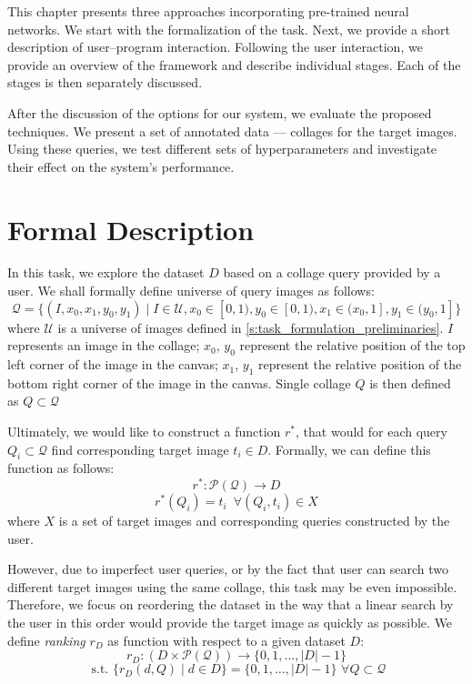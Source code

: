 This chapter presents three approaches incorporating pre-trained neural networks. We start with the formalization of the task. Next, we provide a short description of user--program interaction. Following the user interaction, we provide an overview of the framework and describe individual stages. Each of the stages is then separately discussed. 

After the discussion of the options for our system, we evaluate the proposed techniques. We present a set of annotated data --- collages for the target images. Using these queries, we test different sets of hyperparameters and investigate their effect on the system's performance. 

\section{Formal Description}
\label{s:task_formulation}

In this task, we explore the dataset $D$ based on a collage query provided by a user. We shall formally define universe of query images as follows: 
$$
    \mathcal{Q} = \{(I, x_0, x_1, y_0, y_1) \mid I \in \mathcal{U}, x_0 \in [0,1), y_0 \in [0, 1), x_1 \in (x_0, 1], y_1 \in (y_0, 1] \}
$$
where $\mathcal{U}$ is a universe of images defined in \autoref{s:task_formulation_preliminaries}. $I$ represents an image in the collage; $x_0$, $y_0$ represent the relative position of the top left corner of the image in the canvas; $x_1$, $y_1$ represent the relative position of the bottom right corner of the image in the canvas. Single collage $Q$ is then defined as $Q \subset \mathcal{Q}$

Ultimately, we would like to construct a function $r^*$, that would for each query $Q_i \subset \mathcal{Q}$ find corresponding target image $t_i \in D$. Formally, we can define this function as follows:
$$
    r^*: \mathcal{P(Q)} \rightarrow D 
$$
$$
    r^*(Q_i) = t_i \,\,\, \forall (Q_i, t_i) \in X
$$
where $X$ is a set of target images and corresponding queries constructed by the user.

However, due to imperfect user queries, or by the fact that user can search two different target images using the same collage, this task may be even impossible. Therefore, we focus on reordering the dataset in the way that a linear search by the user in this order would provide the target image as quickly as possible. We define \emph{ranking} $r_{D}$ as function with respect to a given dataset $D$:
$$
    r_D: (D \times \mathcal{P(Q)}) \rightarrow \{0, 1, \ldots, |D|-1  \}
$$
$$
    \text{ s.t. } \{r_D(d, Q) \mid d \in D \} = \{0, 1, \ldots, |D|-1  \} \,\, \forall Q \subset \mathcal{Q}
$$



